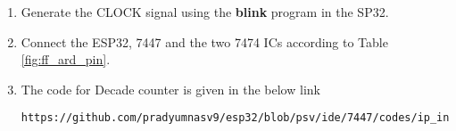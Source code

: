 \begin{enumerate}
\item Generate the CLOCK signal using the \textbf{blink} program in the SP32.
\item Connect the ESP32, 7447 and the two 7474 ICs according to Table \ref{fig:ff_ard_pin}.
\begin{table}[H]
\centering

\caption{}
\label{fig:ff_ard_pin}
\end{table}
%
%
\item
The code for Decade counter is given in the below link
\begin{lstlisting}
https://github.com/pradyumnasv9/esp32/blob/psv/ide/7447/codes/ip_inc_dec.ino
\end{lstlisting}
\end{enumerate}



